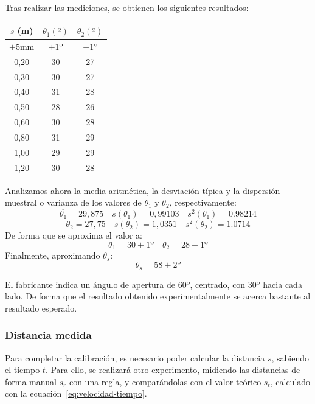 \documentclass[10pt,a4paper,hidelinks,twocolumn]{article}
\begin{document}
Tras realizar las mediciones, se obtienen los siguientes resultados:
\begin{center}
\begin{tabular}{ | c | c | c | }
\hline
$s$ (m) & $\theta_1(º)$ & $\theta_2(º)$ \\ \hline
$\pm5$mm & $\pm1º$ & $\pm1º$ \\ \hline \hline
0,20 & 30 & 27 \\ \hline
0,30 & 30 & 27 \\ \hline
0,40 & 31 & 28 \\ \hline
0,50 & 28 & 26 \\ \hline
0,60 & 30 & 28 \\ \hline
0,80 & 31 & 29 \\ \hline
1,00 & 29 & 29 \\ \hline
1,20 & 30 & 28 \\ \hline
\end{tabular}
\end{center}

Analizamos ahora la media aritmética, la desviación típica y la dispersión 
muestral o varianza de los valores de $\theta_1$ y $\theta_2$, respectivamente:
$$ \overline{\theta_1} = 29,875 \quad s(\theta_1) = 0,99103 \quad s^2(\theta_1) 
= 0.98214 $$
$$ \overline{\theta_2} = 27,75 \quad s(\theta_2) = 1,0351 \quad s^2(\theta_2) = 
1.0714 $$
De forma que se aproxima el valor a:
$$ \theta_1 = 30 \pm 1º \quad \theta_2 = 28 \pm 1º $$
Finalmente, aproximando $\theta_s$:
$$\theta_s = 58 \pm 2º$$

El fabricante indica un ángulo de apertura de 60º, centrado, con 30º hacia cada 
lado. De forma que el resultado obtenido experimentalmente se acerca bastante al 
resultado esperado.

%

\subsubsection{Distancia medida}

Para completar la calibración, es necesario poder calcular la distancia $s$,
sabiendo el tiempo $t$. Para ello, se realizará otro experimento, midiendo las
distancias de forma manual $s_r$ con una regla, y comparándolas con el valor
teórico $s_t$, calculado con la ecuación~\ref{eq:velocidad-tiempo}.
\end{document}
